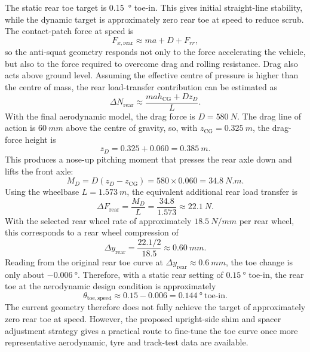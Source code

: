 The static rear toe target is \SI{0.15}{\degree} toe-in. This gives initial straight-line stability, while the dynamic target is approximately zero rear toe at speed to reduce scrub. The contact-patch force at speed is
\begin{equation}
F_{x,\mathrm{rear}}\approx ma+D+F_{rr},
\end{equation}
so the anti-squat geometry responds not only to the force accelerating the vehicle, but also to the force required to overcome drag and rolling resistance. Drag also acts above ground level. Assuming the effective centre of pressure is higher than the centre of mass, the rear load-transfer contribution can be estimated as
\begin{equation}
\Delta N_{\mathrm{rear}}\approx\frac{ma h_{\mathrm{CG}}+D z_D}{L}.
\end{equation}
\iffalse
With the final aerodynamic model, the drag force is \(D=\SI{580}{N}\). The drag line of action is \(\SI{60}{mm}\) above the centre of gravity, so, with \(z_{\mathrm{CG}}=\SI{0.325}{m}\), the drag-force height is
\begin{equation}
z_D = 0.325 + 0.060 = \SI{0.385}{m}.
\end{equation}
This produces a nose-up pitching moment that presses the rear axle down and lifts the front axle:
\begin{equation}
M_D = D(z_D-z_{\mathrm{CG}})
= 580 \times 0.060
= \SI{34.8}{N.m}.
\end{equation}
Using the wheelbase \(L=\SI{1.573}{m}\), the equivalent additional rear load transfer is
\begin{equation}
\Delta F_{\mathrm{rear}}
= \frac{M_D}{L}
= \frac{34.8}{1.573}
\approx \SI{22.1}{N}.
\end{equation}
With the selected rear wheel rate of approximately \(\SI{18.5}{N/mm}\) per rear wheel, this corresponds to a rear wheel compression of
\begin{equation}
\Delta y_{\mathrm{rear}}
= \frac{22.1/2}{18.5}
\approx \SI{0.60}{mm}.
\end{equation}
Reading from the original rear toe curve at \(\Delta y_{\mathrm{rear}}\approx\SI{0.6}{mm}\), the toe change is only about \(-\SI{0.006}{\degree}\). Therefore, with a static rear setting of \(\SI{0.15}{\degree}\) toe-in, the rear toe at the aerodynamic design condition is approximately
\begin{equation}
\theta_{\mathrm{toe,speed}}
\approx 0.15 - 0.006
= \SI{0.144}{\degree}\ \text{toe-in}.
\end{equation}
The current geometry therefore does not fully achieve the target of approximately zero rear toe at speed. However, the proposed upright-side shim and spacer adjustment strategy gives a practical route to fine-tune the toe curve once more representative aerodynamic, tyre and track-test data are available.

